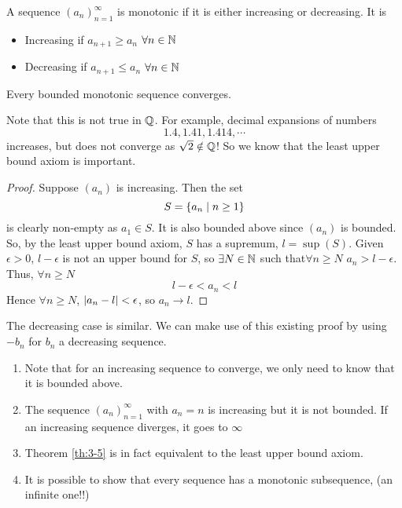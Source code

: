 \documentclass{article}
\begin{document}
\begin{defi}[Monotonic]
    A sequence $(a_n)_{n=1}^\infty$ is monotonic if it is either increasing or decreasing.
    It is
    \begin{itemize}
        \item Increasing if $a_{n+1} \geq a_n$ $\forall n \in \mathbb{N}$
        \item Decreasing if $a_{n+1} \leq a_n$ $\forall n \in \mathbb{N}$
    \end{itemize}
\end{defi}

\begin{nthm}\label{th:3-5}
    Every bounded monotonic sequence converges.
\end{nthm}
\begin{remark}
    Note that this is not true in $\mathbb{Q}$. For example, decimal expansions of numbers
    \[
        1.4, 1.41, 1.414, \cdots  
    \]
    increases, but does not converge as $\sqrt 2 \notin \mathbb{Q}$!
    So we know that the least upper bound axiom is important. 
\end{remark}
\begin{proof}
    Suppose $(a_n)$ is increasing.
    Then the set
    \[
        S = \left\{ a_n \mid n \geq 1 \right\}  
    \]
    is clearly non-empty as $a_1 \in S$.
    It is also bounded above since $(a_n)$ is bounded.
    So, by the least upper bound axiom,
    $S$ has a supremum, $l = \sup (S)$.
    Given $\epsilon > 0$, $l - \epsilon$ is not an upper bound for $S$, so $\exists N \in \mathbb{N}$ such that$\forall n \geq N$ $a_n > l - \epsilon$.
    Thus, $\forall n \geq N$
    \[
        l - \epsilon < a_n < l
    \]
    Hence $\forall n \geq N$, $\left\lvert a_n - l\right\rvert < \epsilon$, so $a_n \rightarrow l$.
\end{proof}
\begin{remark}
    The decreasing case is similar. We can make use of this existing proof by using $-b_n$ for $b_n$ a decreasing sequence.
    \begin{enumerate}[label=(\arabic*)]
        \item Note that for an increasing sequence to converge, we only need to know that it is bounded above.
        \item The sequence $(a_n)_{n=1}^\infty$ with $a_n = n$ is increasing but it is not bounded. 
        If an increasing sequence diverges, it goes to $\infty$
        \item Theorem \ref{th:3-5} is in fact equivalent to the least upper bound axiom.
        \item It is possible to show that every sequence has a monotonic subsequence, (an infinite one!!)
    \end{enumerate}
\end{remark}
\end{document}
